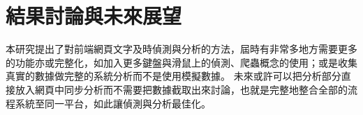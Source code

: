 \chapter{結果討論與未來展望}
\label{c:intro}
本研究提出了對前端網頁文字及時偵測與分析的方法，屆時有非常多地方需要更多的功能亦或完整化，如加入更多鍵盤與滑鼠上的偵測、爬蟲概念的使用；或是收集真實的數據做完整的系統分析而不是使用模擬數據。
未來或許可以把分析部分直接放入網頁中同步分析而不需要把數據截取出來討論，也就是完整地整合全部的流程系統至同一平台，如此讓偵測與分析最佳化。

